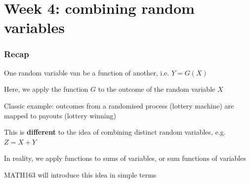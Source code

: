 \documentclass[t,8pt]{beamer}%
\begin{document}
\section{Week 4: combining random variables}

\begin{frame}
    \frametitle{Recap}
    One random variable van be a function of another, i.e. $Y=G(X)$ \par
    Here, we apply the function $G$ to the outcome of the random variable $X$ \par
    Classic example: outcomes from a randomised process (lottery machine) are mapped to payouts (lottery winning) \par
    This is {\bf different} to the idea of combining distinct random variables, e.g. $Z=X+Y$ \par
    In reality, we apply functions to sums of variables, or sum functions of variables \par
    MATH163 will introduce this idea in simple terms
\end{frame}
\end{document}
